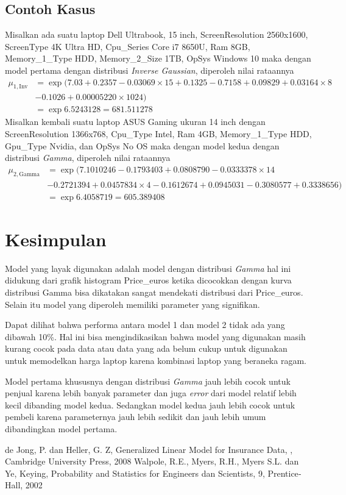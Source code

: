 \documentclass[12pt]{article}
\begin{document}
\subsection{Contoh Kasus}  
Misalkan ada suatu laptop Dell Ultrabook, 15 inch, ScreenResolution 2560x1600, ScreenType 4K Ultra HD, Cpu\_Series Core i7 8650U, Ram 8GB, Memory\_1\_Type HDD, Memory\_2\_Size 1TB, OpSys Windows 10 maka dengan model pertama dengan distribusi \textit{Inverse Gaussian}, diperoleh nilai rataannya 
\begin{align*}
    \mu_{1,\text{Inv}} &= \exp{(7.03+0.2357-0.03069\times 15+0.1325-0.7158+0.09829+0.03164\times 8} \\
    &-0.1026+0.00005220\times 1024) \\
    &= \exp{6.5243128} = 681.511278
\end{align*}
Misalkan kembali suatu laptop ASUS Gaming ukuran 14 inch dengan ScreenResolution 1366x768, Cpu\_Type Intel, Ram 4GB, Memory\_1\_Type HDD, Gpu\_Type Nvidia, dan OpSys No OS maka dengan model kedua dengan distribusi \textit{Gamma}, diperoleh nilai rataannya 
\begin{align*}
    \mu_{2,\text{Gamma}} &= \exp{(7.1010246-0.1793403+0.0808790-0.0333378\times 14} \\ &-0.2721394 +0.0457834\times4-0.1612674+0.0945031-0.3080577+0.3338656)\\
    &= \exp{6.4058719} = 605.389408
\end{align*}
\newpage
\section{Kesimpulan}
Model yang layak digunakan adalah model dengan distribusi \textit{Gamma} hal ini didukung dari grafik histogram Price\_euros ketika dicocokkan dengan kurva distribusi Gamma bisa dikatakan sangat mendekati distribusi dari Price\_euros. Selain itu  model yang diperoleh memiliki parameter yang signifikan.
\par
Dapat dilihat bahwa performa antara model 1 dan model 2 tidak ada yang dibawah 10\%. Hal ini bisa mengindikasikan bahwa model yang digunakan masih kurang cocok pada data atau data yang ada belum cukup untuk digunakan untuk memodelkan harga laptop karena kombinasi laptop yang beraneka ragam.  
\par
Model pertama khususnya dengan distribusi \textit{Gamma} jauh lebih cocok untuk penjual karena lebih banyak parameter dan juga \textit{error} dari model relatif lebih kecil dibanding model kedua. Sedangkan model kedua jauh lebih cocok untuk pembeli karena parameternya jauh lebih sedikit dan jauh lebih umum dibandingkan model pertama.  
\newpage
\begin{thebibliography}{9}
de Jong, P. dan Heller, G. Z, Generalized Linear Model for Insurance Data, , Cambridge University Press, 2008
Walpole, R.E., Myers, R.H., Myers S.L. dan Ye, Keying, Probability and Statistics for Engineers dan Scientists, 9, Prentice‐Hall, 2002

\end{thebibliography}
\newpage
\appendix   
\end{document}
